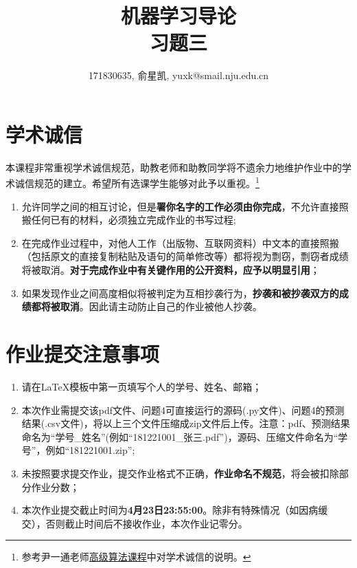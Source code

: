 \documentclass[a4paper,UTF8]{article}
\theoremstyle{definition}
\begin{document}
\title{机器学习导论\\习题三}
\author{171830635, 俞星凯, yuxk@smail.nju.edu.cn}
\maketitle


\section*{学术诚信}

本课程非常重视学术诚信规范，助教老师和助教同学将不遗余力地维护作业中的学术诚信规范的建立。希望所有选课学生能够对此予以重视。\footnote{参考尹一通老师\href{http://tcs.nju.edu.cn/wiki/}{高级算法课程}中对学术诚信的说明。}

\begin{tcolorbox}
	\begin{enumerate}
		\item[(1)] 允许同学之间的相互讨论，但是{\color{red}\textbf{署你名字的工作必须由你完成}}，不允许直接照搬任何已有的材料，必须独立完成作业的书写过程;
		\item[(2)] 在完成作业过程中，对他人工作（出版物、互联网资料）中文本的直接照搬（包括原文的直接复制粘贴及语句的简单修改等）都将视为剽窃，剽窃者成绩将被取消。{\color{red}\textbf{对于完成作业中有关键作用的公开资料，应予以明显引用}}；
		\item[(3)] 如果发现作业之间高度相似将被判定为互相抄袭行为，{\color{red}\textbf{抄袭和被抄袭双方的成绩都将被取消}}。因此请主动防止自己的作业被他人抄袭。
	\end{enumerate}
\end{tcolorbox}

\section*{作业提交注意事项}
\begin{tcolorbox}
	\begin{enumerate}
		\item[(1)] 请在LaTeX模板中第一页填写个人的学号、姓名、邮箱；
		\item[(2)] 本次作业需提交该pdf文件、问题4可直接运行的源码(.py文件)、问题4的预测结果(.csv文件)，将以上三个文件压缩成zip文件后上传。注意：pdf、预测结果命名为“学号\_姓名”(例如“181221001\_张三.pdf”)，源码、压缩文件命名为“学号”，例如“181221001.zip”;
		\item[(3)] 未按照要求提交作业，提交作业格式不正确，{\color{red}\textbf{作业命名不规范}}，将会被扣除部分作业分数；
		\item[(4)] 本次作业提交截止时间为{\color{red}\textbf{4月23日23:55:00}}。除非有特殊情况（如因病缓交），否则截止时间后不接收作业，本次作业记零分。
	\end{enumerate}
\end{tcolorbox}
\end{document}
